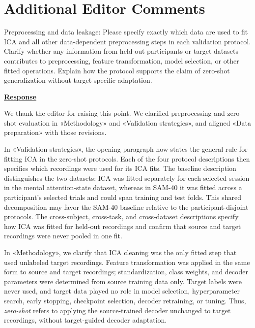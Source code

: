 \documentclass{article}
\begin{document}
\section*{Additional Editor Comments}

\vspace{0.4cm}

\begin{cmt}{}{}

Preprocessing and data leakage: Please specify exactly which data are used to
fit ICA and all other data-dependent preprocessing steps in each validation
protocol. Clarify whether any information from held-out participants or target
datasets contributes to preprocessing, feature transformation, model selection,
or other fitted operations. Explain how the protocol supports the claim of
zero-shot generalization without target-specific adaptation.

\end{cmt}
\vspace{0.1cm}
\noindent
\underline{\textbf{Response}}
\vspace{0.2cm}

We thank the editor for raising this point. We clarified preprocessing and
zero-shot evaluation in «Methodology» and «Validation strategies»,
and aligned «Data preparation» with those revisions.

In «Validation strategies», the opening paragraph now states the general
rule for fitting ICA in the zero-shot protocols. Each of the four protocol
descriptions then specifies which recordings were used for its ICA fits. The
baseline description distinguishes the two datasets: ICA was fitted separately
for each selected session in the mental attention-state dataset, whereas in
SAM-40 it was fitted across a participant's selected trials and could span
training and test folds. This shared decomposition may favor the SAM-40 baseline
relative to the participant-disjoint protocols. The cross-subject, cross-task,
and cross-dataset descriptions specify how ICA was fitted for held-out
recordings and confirm that source and target recordings were never pooled in
one fit.

In «Methodology», we clarify that ICA cleaning was the only fitted step
that used unlabeled target recordings. Feature transformation was applied in the
same form to source and target recordings; standardization, class weights, and
decoder parameters were determined from source training data only. Target
labels were never used, and target data played no role in model selection,
hyperparameter search, early stopping, checkpoint selection, decoder
retraining, or tuning. Thus, \textit{zero-shot} refers to applying the
source-trained decoder unchanged to target recordings, without target-guided
decoder adaptation.
\end{document}
